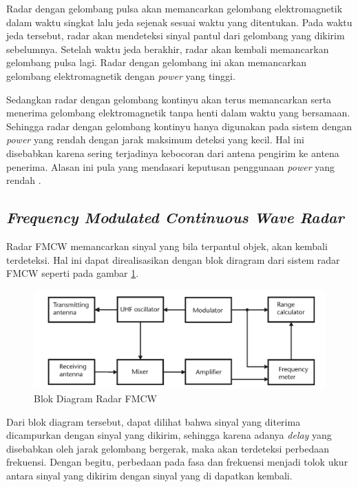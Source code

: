 Radar dengan gelombang pulsa akan memancarkan gelombang elektromagnetik dalam waktu singkat lalu jeda sejenak sesuai waktu yang ditentukan. Pada waktu jeda tersebut, radar akan mendeteksi sinyal pantul dari gelombang yang dikirim sebelumnya. Setelah waktu jeda berakhir, radar akan kembali memancarkan gelombang pulsa lagi. Radar dengan gelombang ini akan memancarkan gelombang elektromagnetik dengan \textit{power} yang tinggi. 

Sedangkan radar dengan gelombang kontinyu akan terus memancarkan serta menerima gelombang elektromagnetik tanpa henti dalam waktu yang bersamaan. Sehingga radar dengan gelombang kontinyu hanya digunakan pada sistem dengan \textit{power} yang rendah dengan jarak maksimum deteksi yang kecil. Hal ini disebabkan karena sering terjadinya kebocoran dari antena pengirim ke antena penerima. Alasan ini pula yang mendasari keputusan penggunaan \textit{power} yang rendah \cite{Scheer2015}.

\subsection{\textit{Frequency Modulated Continuous Wave Radar}}

Radar FMCW memancarkan sinyal yang bila terpantul objek, akan kembali terdeteksi. Hal ini dapat direalisasikan dengan blok diragram dari sistem radar FMCW seperti pada gambar \ref{pic:FMCWBlock}.  

\begin{figure}
	\begin{center}
		\includegraphics[scale=0.3]{pics/bab2/blokDiagramFMCW.png}
		\caption[Blok Diagram Radar FMCW]{Blok Diagram Radar FMCW}
		\label{pic:FMCWBlock}
	\end{center}
\end{figure}

Dari blok diagram tersebut, dapat dilihat bahwa sinyal yang diterima dicampurkan dengan sinyal yang dikirim, sehingga karena adanya \textit{delay} yang disebabkan oleh jarak gelombang bergerak, maka akan terdeteksi perbedaan frekuensi. Dengan begitu, perbedaan pada fasa dan frekuensi menjadi tolok ukur antara sinyal yang dikirim dengan sinyal yang di dapatkan kembali.

